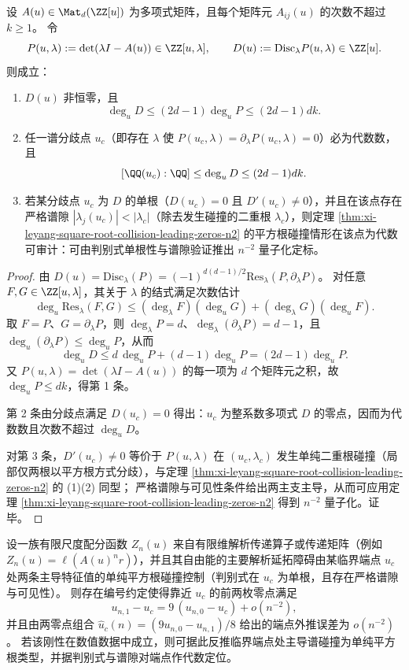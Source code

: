 \begin{theorem}[多项式传递矩阵的临界点代数性与判别式复杂度上界]\label{thm:xi-polynomial-transfer-matrix-branchpoint-discriminant-degree}
设 \(A(u)\in\Mat_d(\ZZ[u])\) 为多项式矩阵，且每个矩阵元 \(A_{ij}(u)\) 的次数不超过 \(k\ge 1\)。
令
\[
P(u,\lambda):=\det(\lambda I-A(u))\in\ZZ[u,\lambda],
\qquad
D(u):=\mathrm{Disc}_\lambda P(u,\lambda)\in\ZZ[u].
\]
则成立：
\begin{enumerate}
  \item \(D(u)\) 非恒零，且
  \[
  \deg_u D\le (2d-1)\deg_u P\le (2d-1)dk.
  \]
  \item 任一谱分歧点 \(u_c\)（即存在 \(\lambda\) 使 \(P(u_c,\lambda)=\partial_\lambda P(u_c,\lambda)=0\)）必为代数数，且
  \[
  [\QQ(u_c):\QQ]\le \deg_u D \le (2d-1)dk.
  \]
  \item 若某分歧点 \(u_c\) 为 \(D\) 的单根（\(D(u_c)=0\) 且 \(D'(u_c)\neq 0\)），并且在该点存在严格谱隙 \(|\lambda_j(u_c)|<|\lambda_c|\)（除去发生碰撞的二重根 \(\lambda_c\)），则定理 \ref{thm:xi-leyang-square-root-collision-leading-zeros-n2} 的平方根碰撞情形在该点为代数可审计：可由判别式单根性与谱隙验证推出 \(n^{-2}\) 量子化定标。
\end{enumerate}
\end{theorem}
\begin{proof}
由 \(D(u)=\mathrm{Disc}_\lambda(P)=(-1)^{d(d-1)/2}\mathrm{Res}_\lambda(P,\partial_\lambda P)\)。
对任意 \(F,G\in\ZZ[u,\lambda]\)，其关于 \(\lambda\) 的结式满足次数估计
\[
\deg_u\mathrm{Res}_\lambda(F,G)
\le (\deg_\lambda F)(\deg_u G)+(\deg_\lambda G)(\deg_u F).
\]
取 \(F=P\)、\(G=\partial_\lambda P\)，则 \(\deg_\lambda P=d\)、\(\deg_\lambda(\partial_\lambda P)=d-1\)，且 \(\deg_u(\partial_\lambda P)\le \deg_u P\)，从而
\[
\deg_u D\le d\,\deg_u P+(d-1)\deg_u P=(2d-1)\deg_u P.
\]
又 \(P(u,\lambda)=\det(\lambda I-A(u))\) 的每一项为 \(d\) 个矩阵元之积，故 \(\deg_u P\le dk\)，得第 1 条。

第 2 条由分歧点满足 \(D(u_c)=0\) 得出：\(u_c\) 为整系数多项式 \(D\) 的零点，因而为代数数且次数不超过 \(\deg_u D\)。

对第 3 条，\(D'(u_c)\neq 0\) 等价于 \(P(u,\lambda)\) 在 \((u_c,\lambda_c)\) 发生单纯二重根碰撞（局部仅两根以平方根方式分歧），与定理 \ref{thm:xi-leyang-square-root-collision-leading-zeros-n2} 的 (1)(2) 同型；
严格谱隙与可见性条件给出两主支主导，从而可应用定理 \ref{thm:xi-leyang-square-root-collision-leading-zeros-n2} 得到 \(n^{-2}\) 量子化。证毕。
\end{proof}

\begin{conjecture}[平方根端点下的两零点比值刚性与超收敛外推]\label{conj:xi-leyang-square-root-endpoint-two-zero-ratio}
设一族有限尺度配分函数 \(Z_n(u)\) 来自有限维解析传递算子或传递矩阵（例如 \(Z_n(u)=\ell(A(u)^n r)\)），并且其自由能的主要解析延拓障碍由某临界端点 \(u_c\) 处两条主导特征值的单纯平方根碰撞控制（判别式在 \(u_c\) 为单根，且存在严格谱隙与可见性）。
则存在编号约定使得靠近 \(u_c\) 的前两枚零点满足
\[
u_{n,1}-u_c=9\,(u_{n,0}-u_c)+o(n^{-2}),
\]
并且由两零点组合
\(
\widehat u_c(n)=(9u_{n,0}-u_{n,1})/8
\)
给出的端点外推误差为 \(o(n^{-2})\)。
若该刚性在数值数据中成立，则可据此反推临界端点处主导谱碰撞为单纯平方根类型，并据判别式与谱隙对端点作代数定位。
\end{conjecture}

